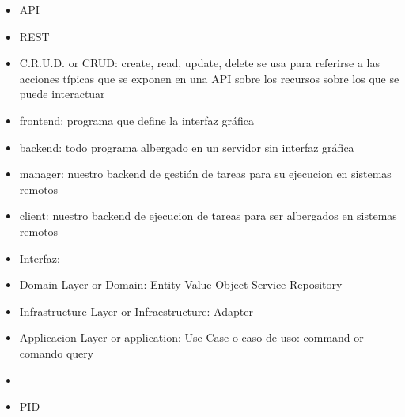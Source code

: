\begin{itemize}
	\item API
	\item REST
	\item C.R.U.D. or CRUD: create, read, update, delete se usa para referirse a las acciones típicas que se exponen en una API sobre los recursos sobre los que se puede interactuar
	\item frontend: programa que define la interfaz gráfica
	\item backend: todo programa albergado en un servidor sin interfaz gráfica
	\item manager: nuestro backend de gestión de tareas para su ejecucion en sistemas remotos
	\item client: nuestro backend de ejecucion de tareas para ser albergados en sistemas remotos
	\item Interfaz:
	\item Domain Layer or Domain:
		\subitem Entity
		\subitem Value Object
		\subitem Service
		\subitem Repository
	\item Infrastructure Layer or Infraestructure:
		\subitem Adapter
	\item Applicacion Layer or application:
		\subitem Use Case o caso de uso:
		\subitem command or comando
		\subitem query
	\item
	\item PID
\end{itemize} 
